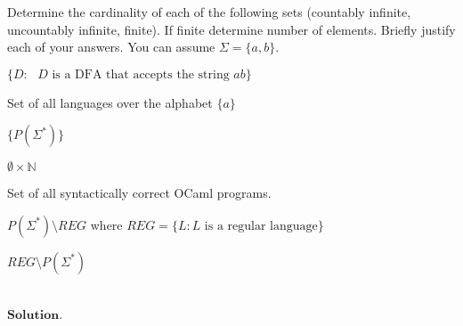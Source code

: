 \documentclass[solution, letterpaper]{cs121}
\begin{document}


Determine the cardinality of each of the following sets (countably infinite, uncountably infinite, finite). If finite determine number of elements. Briefly justify each of your answers. You can assume $\Sigma = \{a, b\}$.

\subproblem $\{D: \text{ $D$ is a DFA that accepts the string } ab  \}$

\subproblem Set of all languages over the alphabet $\{ a\}$

\subproblem $\{P(\Sigma^*) \}$

\subproblem $\emptyset \times \mathbb{N}$

\subproblem Set of all syntactically correct OCaml programs. 

\subproblem $P(\Sigma^*)  \setminus  REG$ where $REG = \{L : L \text{ is a regular language} \}$ 

\subproblem $ REG  \setminus  P(\Sigma^*)$ 

\noindent\\$\textbf{Solution}$.
\end{document}
